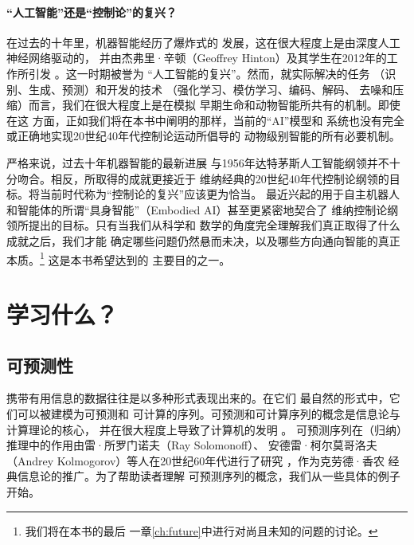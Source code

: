 \documentclass[../../book-main_zh.tex]{subfiles}
\begin{document}
\paragraph{“人工智能”还是“控制论”的复兴？}
在过去的十年里，机器智能经历了爆炸式的
发展，这在很大程度上是由深度人工神经网络驱动的，
并由杰弗里·辛顿（Geoffrey Hinton）及其学生在2012年的工作所引发
\cite{krizhevsky2012imagenet}。这一时期被誉为
“人工智能的复兴”。然而，就实际解决的任务
（识别、生成、预测）和开发的技术
（强化学习、模仿学习、编码、解码、
去噪和压缩）而言，我们在很大程度上是在模拟
早期生命和动物智能所共有的机制。即使在这
方面，正如我们将在本书中阐明的那样，当前的“AI”模型和
系统也没有完全或正确地实现20世纪40年代控制论运动所倡导的
动物级别智能的所有必要机制。

严格来说，过去十年机器智能的最新进展
与1956年达特茅斯人工智能纲领并不十分吻合。相反，所取得的成就更接近于
维纳经典的20世纪40年代控制论纲领的目标。将当前时代称为“控制论的复兴”应该更为恰当。
最近兴起的用于自主机器人和智能体的所谓“具身智能”（Embodied AI）甚至更紧密地契合了
维纳控制论纲领所提出的目标。只有当我们从科学和
数学的角度完全理解我们真正取得了什么成就之后，我们才能
确定哪些问题仍然悬而未决，以及哪些方向通向智能的真正本质。\footnote{我们将在本书的最后
一章\ref{ch:future}中进行对尚且未知的问题的讨论。} 这是本书希望达到的
主要目的之一。

\section{学习什么？}
\label{sec:what-to-learn}

\subsection{可预测性}
\label{sec:predictability}
携带有用信息的数据往往是以多种形式表现出来的。在它们
最自然的形式中，它们可以被建模为可预测和
可计算的序列。可预测和可计算序列的概念是信息论\cite{Shannon-1948}与计算理论的核心，
并在很大程度上导致了计算机的发明 \cite{Turing-1936}。
可预测序列在（归纳）推理中的作用由雷·所罗门诺夫（Ray Solomonoff）、
安德雷·柯尔莫哥洛夫（Andrey Kolmogorov）等人在20世纪60年代进行了研究
\cite{Kolmogorov1998OnTO}，作为克劳德·香农
经典信息论的推广。为了帮助读者理解
可预测序列的概念，我们从一些具体的例子开始。
\end{document}
